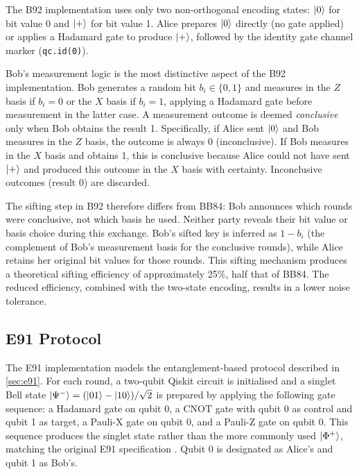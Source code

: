 \documentclass[10pt, a4paper]{report}
\begin{document}
The B92 implementation uses only two non-orthogonal encoding states: $\ket{0}$ for bit value 0 and $\ket{+}$ for bit value 1. Alice prepares $\ket{0}$ directly (no gate applied) or applies a Hadamard gate to produce $\ket{+}$, followed by the identity gate channel marker (\texttt{qc.id(0)}).

Bob's measurement logic is the most distinctive aspect of the B92 implementation. Bob generates a random bit $b_i \in \{0, 1\}$ and measures in the $Z$ basis if $b_i = 0$ or the $X$ basis if $b_i = 1$, applying a Hadamard gate before measurement in the latter case. A measurement outcome is deemed \textit{conclusive} only when Bob obtains the result 1. Specifically, if Alice sent $\ket{0}$ and Bob measures in the $Z$ basis, the outcome is always 0 (inconclusive). If Bob measures in the $X$ basis and obtains 1, this is conclusive because Alice could not have sent $\ket{+}$ and produced this outcome in the $X$ basis with certainty. Inconclusive outcomes (result 0) are discarded.

The sifting step in B92 therefore differs from BB84: Bob announces which rounds were conclusive, not which basis he used. Neither party reveals their bit value or basis choice during this exchange. Bob's sifted key is inferred as $1 - b_i$ (the complement of Bob's measurement basis for the conclusive rounds), while Alice retains her original bit values for those rounds. This sifting mechanism produces a theoretical sifting efficiency of approximately 25\%, half that of BB84. The reduced efficiency, combined with the two-state encoding, results in a lower noise tolerance.

% 


\subsection{E91 Protocol}

The E91 implementation models the entanglement-based protocol described in \cref{sec:e91}. For each round, a two-qubit Qiskit circuit is initialised and a singlet Bell state $\ket{\Psi^{-}} = (\ket{01} - \ket{10})/\sqrt{2}$ is prepared by applying the following gate sequence: a Hadamard gate on qubit 0, a CNOT gate with qubit 0 as control and qubit 1 as target, a Pauli-X gate on qubit 0, and a Pauli-Z gate on qubit 0. This sequence produces the singlet state rather than the more commonly used $\ket{\Phi^+}$, matching the original E91 specification \cite{E91}. Qubit 0 is designated as Alice's and qubit 1 as Bob's.
\end{document}
